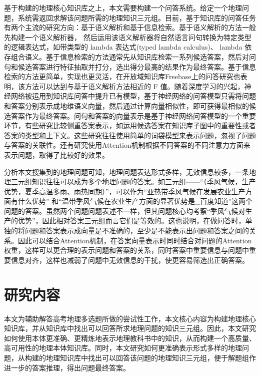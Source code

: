 基于构建的地理核心知识库之上，本文需要构建一个问答系统。给定一个地理问题，系统需返回求解该问题所需的地理知识三元组。目前，基于知识库的问答任务有两个主流的研究方向：基于语义解析\cite{Zettlemoyer0,Cai,BerantCA,Dyer}和基于信息检索\cite{Yao,Bordes1,Dong,Bordes2}。基于语义解析的方法一般先构建一个语义解析器， 然后运用该语义解析器将自然语言问句转换为特定类型的逻辑表达式，如带类型的 lambda 表达式(typed lambda calculus)、 lambda 依存组合语义\cite{Wong,BerantCA,Yih}。基于信息检索的方法通常先从知识库检索一系列候选答案，然后对问句和候选答案进行特征抽取并打分，选出得分最高的结果作为最终答案\cite{Bordes1,Kim}。基于信息检索的方法更简单，实现也更灵活，在开放域知识库Freebase上的问答研究也表明，该方法可以达到与基于语义解析方法相近的 F 值\cite{Dong,Bordes2}。随着深度学习的兴起，神经网络被运用到知识库问答中提升已有模型，基于神经网络的问答模型只需将问题和答案分别表示成地维语义向量，然后通过计算向量相似性，即可获得最相似的候选答案作为最终答案。问句和答案的向量表示是基于神经网络问答模型的一个重要环节，有些研究比较侧重答案表示，如运用候选答案在知识库子图中的重要性\cite{Bordes1}或者答案的类型和上下文\cite{Dong}。这些研究往往使用简单的词袋模型来表示问题，忽视了问题与答案的关联性\cite{Bordes1}。还有研究使用Attention机制根据不同答案的不同注意力方面来表示问题\cite{Zhang}，取得了比较好的效果。

分析本文搜集到的地理问题可知，地理问题表达形式多样，无效信息较多，一条地理三元组知识往往可以成为多个地理问题的答案。如三元组——“（季风气候，生产优势，夏季高温多雨、雨热同期）”，可以作为“亚热带季风气候在发展农业生产方面有什么优势” 和“温带季风气候在农业生产方面的显著优势是\_百度知道”这两个问题的答案。虽然两个问题问题表述不一样，但其问题核心均考察“季风气候对生产的优势”，因此相对答案三元组而言它们是等效的。这也说明，在做问答时，单独的将问题和答案表示成向量是不准确的，至少是不能表示出问题和答案之间的关系。因此可以结合Attention机制，在答案向量表示时同时结合对问题的Attention权重，这样可以更合理的表示问题和答案的关系，同时答案中重要信息与问题中重要信息对齐，这样也减弱了问题中无效信息的干扰，使更容易筛选出正确答案。

\section{研究内容}
本文为辅助解答高考地理多选题所做的尝试性工作，本文核心内容为构建地理核心知识库，并从知识库中找出可以回答所求地理问题的知识三元组。因此，本文研究如何使用本体更准确、更精炼地表示地理教科书中的知识，从而构建一个高质量、高可用性的地理本体知识库。同时，本文研究如何更准确表示形式多样的地理问题，从构建的地理知识库中找出可以回答该问题的地理知识三元组，便于解题组作进一步的答案推理，得出问题最终答案。


